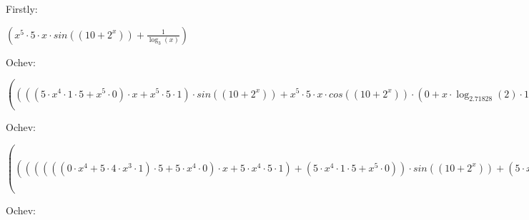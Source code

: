 \documentclass[12pt]{article}
\begin{document}
Firstly: 
\begin{center}
$ ({x}^{5} \cdot 5 \cdot x \cdot sin\left((10 + {2}^{x})\right) + \frac{1}{\log_{3} \left(x\right)}) $
\end{center}
Ochev: 
\begin{center}
$ ((((5 \cdot {x}^{4} \cdot 1 \cdot 5 + {x}^{5} \cdot 0) \cdot x + {x}^{5} \cdot 5 \cdot 1) \cdot sin\left((10 + {2}^{x})\right) + {x}^{5} \cdot 5 \cdot x \cdot cos\left((10 + {2}^{x})\right) \cdot (0 + x \cdot \log_{2.71828} \left(2\right) \cdot 1)) + \frac{(0 \cdot \log_{3} \left(x\right) - 1 \cdot \frac{1}{x \cdot \log_{2.71828} \left(3\right)} \cdot 1)}{\log_{3} \left(x\right) \cdot \log_{3} \left(x\right)}) $
\end{center}
Ochev: 
\begin{center}
$ (((((((0 \cdot {x}^{4} + 5 \cdot 4 \cdot {x}^{3} \cdot 1) \cdot 5 + 5 \cdot {x}^{4} \cdot 0) \cdot x + 5 \cdot {x}^{4} \cdot 5 \cdot 1) + (5 \cdot {x}^{4} \cdot 1 \cdot 5 + {x}^{5} \cdot 0)) \cdot sin\left((10 + {2}^{x})\right) + (5 \cdot {x}^{4} \cdot 5 \cdot x + {x}^{5} \cdot 5) \cdot cos\left((10 + {2}^{x})\right) \cdot (0 + x \cdot \log_{2.71828} \left(2\right) \cdot 1)) + (((5 \cdot {x}^{4} \cdot 1 \cdot 5 + {x}^{5} \cdot 0) \cdot x + {x}^{5} \cdot 5 \cdot 1) \cdot cos\left((10 + {2}^{x})\right) \cdot x \cdot \log_{2.71828} \left(2\right) + {x}^{5} \cdot 5 \cdot x \cdot (-1 \cdot sin\left((10 + {2}^{x})\right) \cdot (0 + x \cdot \log_{2.71828} \left(2\right) \cdot 1) \cdot x \cdot \log_{2.71828} \left(2\right) + cos\left((10 + {2}^{x})\right) \cdot (1 \cdot \log_{2.71828} \left(2\right) + x \cdot \frac{1}{2 \cdot \log_{2.71828} \left(2.71828\right)} \cdot 0)))) + \frac{((0 - \frac{(0 \cdot x \cdot \log_{2.71828} \left(3\right) - 1 \cdot (1 \cdot \log_{2.71828} \left(3\right) + x \cdot \frac{1}{3 \cdot \log_{2.71828} \left(2.71828\right)} \cdot 0))}{x \cdot \log_{2.71828} \left(3\right) \cdot x \cdot \log_{2.71828} \left(3\right)}) \cdot \log_{3} \left(x\right) \cdot \log_{3} \left(x\right) - (0 - \frac{1}{x \cdot \log_{2.71828} \left(3\right)}) \cdot (\frac{1}{x \cdot \log_{2.71828} \left(3\right)} \cdot 1 \cdot \log_{3} \left(x\right) + \log_{3} \left(x\right) \cdot \frac{1}{x \cdot \log_{2.71828} \left(3\right)} \cdot 1))}{\log_{3} \left(x\right) \cdot \log_{3} \left(x\right) \cdot \log_{3} \left(x\right) \cdot \log_{3} \left(x\right)}) $
\end{center}
Ochev: 
\end{document}
